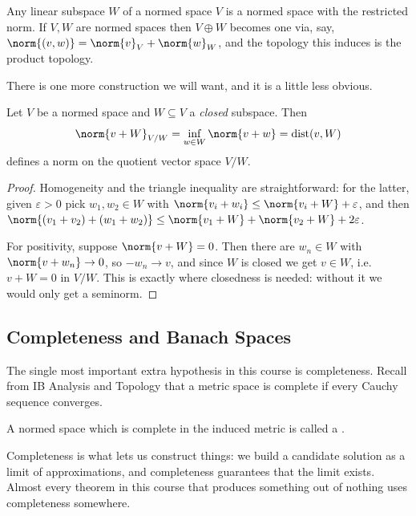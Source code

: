 \documentclass[a4paper]{scrartcl}
\DeclareMathOperator{\dist}{dist}
\begin{document}
\begin{example}
	Any linear subspace $W$ of a normed space $V$ is a normed space with the restricted norm. If $V, W$ are normed spaces then $V \oplus W$ becomes one via, say, $\norm{(v,w)} = \norm{v}_V + \norm{w}_W$, and the topology this induces is the product topology.
\end{example}

There is one more construction we will want, and it is a little less obvious.

\begin{proposition}
	Let $V$ be a normed space and $W \subseteq V$ a \emph{closed} subspace. Then
	$$\norm{v + W}_{V/W} = \inf_{w \in W} \norm{v + w} = \dist(v, W)$$
	defines a norm on the quotient vector space $V/W$.
\end{proposition}

\begin{proof}
	Homogeneity and the triangle inequality are straightforward: for the latter, given $\varepsilon > 0$ pick $w_1, w_2 \in W$ with $\norm{v_i + w_i} \leq \norm{v_i + W} + \varepsilon$, and then $\norm{(v_1 + v_2) + (w_1 + w_2)} \leq \norm{v_1 + W} + \norm{v_2 + W} + 2\varepsilon$.

	For positivity, suppose $\norm{v + W} = 0$. Then there are $w_n \in W$ with $\norm{v + w_n} \to 0$, so $-w_n \to v$, and since $W$ is closed we get $v \in W$, i.e.\ $v + W = 0$ in $V/W$. This is exactly where closedness is needed: without it we would only get a seminorm.
\end{proof}

\subsection{Completeness and Banach Spaces}

The single most important extra hypothesis in this course is completeness. Recall from IB Analysis and Topology that a metric space is complete if every Cauchy sequence converges.

\begin{definition}
	A normed space which is complete in the induced metric is called a .
\end{definition}

Completeness is what lets us construct things: we build a candidate solution as a limit of approximations, and completeness guarantees that the limit exists. Almost every theorem in this course that produces something out of nothing uses completeness somewhere.
\end{document}
